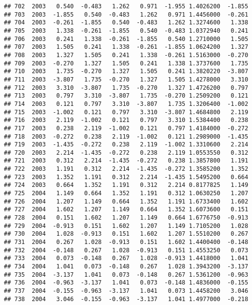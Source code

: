 \documentclass[]{article}
\begin{document}
\begin{verbatim}
## 702  2003   0.540  -0.483   1.262   0.971  -1.955 1.4026200  -1.855
## 703  2003  -1.855   0.540  -0.483   1.262   0.971 1.4456000  -0.261
## 704  2003  -0.261  -1.855   0.540  -0.483   1.262 1.3274600   1.338
## 705  2003   1.338  -0.261  -1.855   0.540  -0.483 1.0372940   0.241
## 706  2003   0.241   1.338  -0.261  -1.855   0.540 1.2710000   1.505
## 707  2003   1.505   0.241   1.338  -0.261  -1.855 1.0624200   1.327
## 708  2003   1.327   1.505   0.241   1.338  -0.261 1.5163000  -0.270
## 709  2003  -0.270   1.327   1.505   0.241   1.338 1.3737600   1.735
## 710  2003   1.735  -0.270   1.327   1.505   0.241 1.3820220  -3.807
## 711  2003  -3.807   1.735  -0.270   1.327   1.505 1.4278000   3.310
## 712  2003   3.310  -3.807   1.735  -0.270   1.327 1.4726200   0.797
## 713  2003   0.797   3.310  -3.807   1.735  -0.270 1.2509200   0.121
## 714  2003   0.121   0.797   3.310  -3.807   1.735 1.3206400  -1.002
## 715  2003  -1.002   0.121   0.797   3.310  -3.807 1.4684800   2.119
## 716  2003   2.119  -1.002   0.121   0.797   3.310 1.5384400   0.238
## 717  2003   0.238   2.119  -1.002   0.121   0.797 1.4184000  -0.272
## 718  2003  -0.272   0.238   2.119  -1.002   0.121 1.2989000  -1.435
## 719  2003  -1.435  -0.272   0.238   2.119  -1.002 1.3310600   2.214
## 720  2003   2.214  -1.435  -0.272   0.238   2.119 1.0553550   0.312
## 721  2003   0.312   2.214  -1.435  -0.272   0.238 1.3857800   1.191
## 722  2003   1.191   0.312   2.214  -1.435  -0.272 1.3585200   1.352
## 723  2003   1.352   1.191   0.312   2.214  -1.435 1.5495200   0.664
## 724  2003   0.664   1.352   1.191   0.312   2.214 0.8177825   1.149
## 725  2004   1.149   0.664   1.352   1.191   0.312 1.0630250   1.207
## 726  2004   1.207   1.149   0.664   1.352   1.191 1.6733400   1.602
## 727  2004   1.602   1.207   1.149   0.664   1.352 1.6073600   0.151
## 728  2004   0.151   1.602   1.207   1.149   0.664 1.6776750  -0.913
## 729  2004  -0.913   0.151   1.602   1.207   1.149 1.7105200   1.028
## 730  2004   1.028  -0.913   0.151   1.602   1.207 1.5510200   0.267
## 731  2004   0.267   1.028  -0.913   0.151   1.602 1.4400400  -0.148
## 732  2004  -0.148   0.267   1.028  -0.913   0.151 1.4553250   0.073
## 733  2004   0.073  -0.148   0.267   1.028  -0.913 1.4418000   1.041
## 734  2004   1.041   0.073  -0.148   0.267   1.028 1.3943200  -3.137
## 735  2004  -3.137   1.041   0.073  -0.148   0.267 1.5361200  -0.963
## 736  2004  -0.963  -3.137   1.041   0.073  -0.148 1.4836000  -0.155
## 737  2004  -0.155  -0.963  -3.137   1.041   0.073 1.4458200   3.046
## 738  2004   3.046  -0.155  -0.963  -3.137   1.041 1.4977000  -0.218

\end{verbatim}
\end{document}
